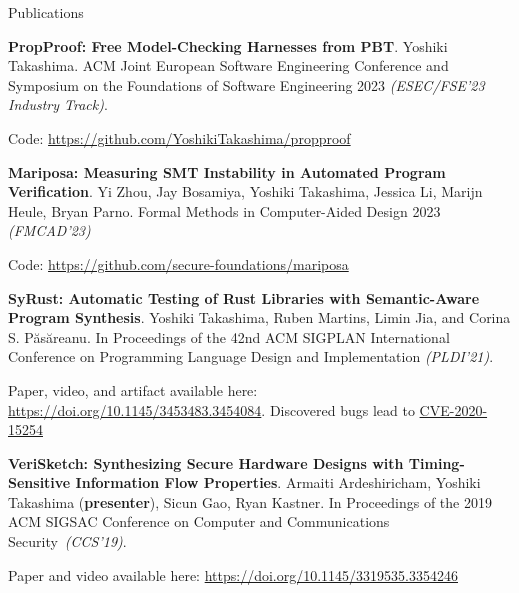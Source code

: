 \documentclass{resume} %
\begin{document}
\begin{rSection}{Publications}

  \begin{rSubsection}{}{}{}{}
  \item \textbf{PropProof: Free Model-Checking Harnesses from PBT}.
    Yoshiki Takashima. ACM Joint European Software Engineering
    Conference and Symposium on the Foundations of Software
    Engineering 2023 \textit{(ESEC/FSE’23 Industry Track)}.

    Code: \href{https://github.com/YoshikiTakashima/propproof}
    {https://github.com/YoshikiTakashima/propproof}

  \item \textbf{Mariposa: Measuring SMT Instability in Automated
      Program Verification}. Yi Zhou, Jay Bosamiya, Yoshiki Takashima,
    Jessica Li, Marijn Heule, Bryan Parno. Formal Methods in
    Computer-Aided Design 2023 \textit{(FMCAD'23)}

    Code: \href{https://github.com/secure-foundations/mariposa}
    {https://github.com/secure-foundations/mariposa}

  \item \textbf{SyRust: Automatic Testing of Rust Libraries
    with Semantic-Aware Program Synthesis}.
    Yoshiki Takashima, Ruben Martins, Limin Jia, and Corina
    S. P\u{a}s\u{a}reanu.  In Proceedings of the 42nd
    ACM SIGPLAN International Conference on Programming Language
    Design and Implementation \textit{(PLDI’21)}.

    Paper, video, and artifact available here:
    \href{https://doi.org/10.1145/3453483.3454084}
    {https://doi.org/10.1145/3453483.3454084}. Discovered bugs lead to
    \href{https://nvd.nist.gov/vuln/detail/CVE-2020-15254}{CVE-2020-15254}

  \item \textbf{VeriSketch: Synthesizing Secure Hardware Designs with
      Timing-Sensitive Information Flow Properties}.  Armaiti
    Ardeshiricham, Yoshiki Takashima (\textbf{presenter}), Sicun Gao,
    Ryan Kastner. In Proceedings of the 2019 ACM SIGSAC Conference on
    Computer and Communications Security~\textit{(CCS'19)}.

    Paper and video available here:
    \href{https://dl.acm.org/doi/abs/10.1145/3319535.3354246}
    {https://doi.org/10.1145/3319535.3354246}
  \end{rSubsection}
\end{rSection}
\end{document}
